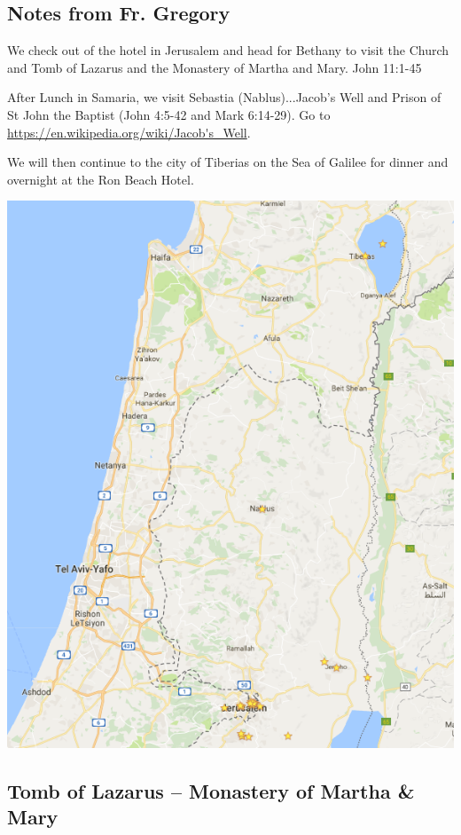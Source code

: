 \documentclass[letterpaper]{report}
\begin{document}
\subsection{Notes from Fr. Gregory}
We check out of the hotel in Jerusalem and head for Bethany to visit the 
Church and Tomb of Lazarus and the Monastery of Martha and Mary.
John 11:1-45

After Lunch in Samaria, we visit Sebastia (Nablus)...Jacob's
Well and Prison of St John the Baptist (John 4:5-42 and Mark 6:14-29). Go to
\url{https://en.wikipedia.org/wiki/Jacob's_Well}.

We will then continue to the city of Tiberias on the Sea of Galilee for dinner 
and overnight at the Ron Beach Hotel.

\includegraphics[height=\textheight]{JerusalemSeaOfGalile}


\clearpage
\subsection{Tomb of Lazarus -- Monastery of Martha \& Mary}
\begin{multicols}{2}
	\mbox{}
\end{multicols}
\end{document}
